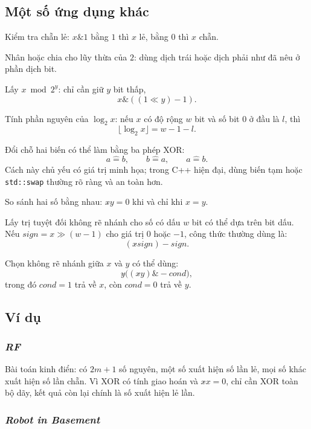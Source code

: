 \documentclass[11pt]{article}
\begin{document}
\subsection{Một số ứng dụng khác}

Kiểm tra chẵn lẻ: \(x\&1\) bằng \(1\) thì \(x\) lẻ, bằng \(0\) thì \(x\) chẵn.

Nhân hoặc chia cho lũy thừa của \(2\): dùng dịch trái hoặc dịch phải như đã
nêu ở phần dịch bit.

Lấy \(x\bmod 2^y\): chỉ cần giữ \(y\) bit thấp,
\[
  x\&((1\ll y)-1).
\]

Tính phần nguyên của \(\log_2 x\): nếu \(x\) có độ rộng \(w\) bit và số bit
\(0\) ở đầu là \(l\), thì
\[
  \lfloor \log_2 x\rfloor = w-1-l.
\]

Đổi chỗ hai biến có thể làm bằng ba phép XOR:
\[
  a\mathrel{\hat{=}}b,\qquad b\mathrel{\hat{=}}a,\qquad a\mathrel{\hat{=}}b.
\]
Cách này chủ yếu có giá trị minh họa; trong C++ hiện đại, dùng biến tạm hoặc
\texttt{std::swap} thường rõ ràng và an toàn hơn.

So sánh hai số bằng nhau: \(x\mathbin{\hat{}}y=0\) khi và chỉ khi \(x=y\).

Lấy trị tuyệt đối không rẽ nhánh cho số có dấu \(w\) bit có thể dựa trên bit
dấu. Nếu \(\mathit{sign}=x\gg(w-1)\) cho giá trị \(0\) hoặc \(-1\), công thức
thường dùng là:
\[
  (x\mathbin{\hat{}}\mathit{sign})-\mathit{sign}.
\]

Chọn không rẽ nhánh giữa \(x\) và \(y\) có thể dùng:
\[
  y\mathbin{\hat{}}\bigl((x\mathbin{\hat{}}y)\&-\mathit{cond}\bigr),
\]
trong đó \(\mathit{cond}=1\) trả về \(x\), còn \(\mathit{cond}=0\) trả về \(y\).

\subsection{Ví dụ}

\subsubsection{\emph{RF}}

Bài toán kinh điển: có \(2m+1\) số nguyên, một số xuất hiện số lần lẻ, mọi số
khác xuất hiện số lần chẵn. Vì XOR có tính giao hoán và \(x\mathbin{\hat{}}x=0\),
chỉ cần XOR toàn bộ dãy, kết quả còn lại chính là số xuất hiện lẻ lần.

\subsubsection{\emph{Robot in Basement}}
\end{document}
